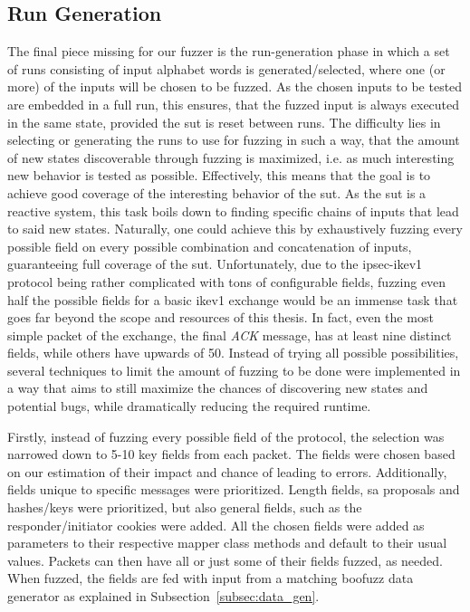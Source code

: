 \subsection{Run Generation} \label{subsec:run_generation}
The final piece missing for our fuzzer is the run-generation phase in which a set of runs consisting of input alphabet words is generated/selected, where one (or more) of the inputs will be chosen to be fuzzed. As the chosen inputs to be tested are embedded in a full run, this ensures, that the fuzzed input is always executed in the same state, provided the \ac{sut} is reset between runs. The difficulty lies in selecting or generating the runs to use for fuzzing in such a way, that the amount of new states discoverable through fuzzing is maximized, i.e. as much interesting new behavior is tested as possible. Effectively, this means that the goal is to achieve good coverage of the interesting behavior of the \ac{sut}. As the \ac{sut} is a reactive system, this task boils down to finding specific chains of inputs that lead to said new states. Naturally, one could achieve this by exhaustively fuzzing every possible field on every possible combination and concatenation of inputs, guaranteeing full coverage of the \ac{sut}. Unfortunately, due to the \ac{ipsec}-\ac{ike}v1 protocol being rather complicated with tons of configurable fields, fuzzing even half the possible fields for a basic \ac{ike}v1 exchange would be an immense task that goes far beyond the scope and resources of this thesis. In fact, even the most simple packet of the exchange, the final \emph{ACK} message, has at least nine distinct fields, while others have upwards of 50. Instead of trying all possible possibilities, several techniques to limit the amount of fuzzing to be done were implemented in a way that aims to still maximize the chances of discovering new states and potential bugs, while dramatically reducing the required runtime. 

Firstly, instead of fuzzing every possible field of the protocol, the selection was narrowed down to 5-10 key fields from each packet. The fields were chosen based on our estimation of their impact and chance of leading to errors. Additionally, fields unique to specific messages were prioritized. Length fields, \ac{sa} proposals and hashes/keys were prioritized, but also general fields, such as the responder/initiator cookies were added. All the chosen fields were added as parameters to their respective mapper class methods and default to their usual values. Packets can then have all or just some of their fields fuzzed, as needed. When fuzzed, the fields are fed with input from a matching boofuzz data generator as explained in Subsection~\ref{subsec:data_gen}.

